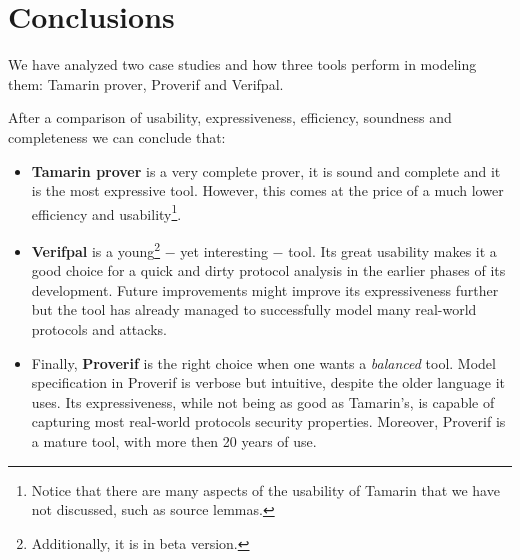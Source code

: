 
\section{Conclusions}
\label{section:conclusions}

We have analyzed two case studies and how three tools perform in modeling them: Tamarin prover, Proverif and Verifpal.

After a comparison of usability, expressiveness, efficiency, soundness and completeness we can conclude that:
\begin{itemize}
    \item{\textbf{Tamarin prover} is a very complete prover, it is sound and complete and it is the most expressive tool. However, this comes at the price of a much lower efficiency and usability\footnote{Notice that there are many aspects of the usability of Tamarin that we have not discussed, such as source lemmas.}.}
    \item{\textbf{Verifpal} is a young\footnote{Additionally, it is in beta version.} $-$ yet interesting $-$ tool. Its great usability makes it a good choice for a quick and dirty protocol analysis in the earlier phases of its development. Future improvements might improve its expressiveness further but the tool has already managed to successfully model many real-world protocols and attacks.}
    \item{Finally, \textbf{Proverif} is the right choice when one wants a \textit{balanced} tool. Model specification in Proverif is verbose but intuitive, despite the older language it uses. Its expressiveness, while not being as good as Tamarin's, is capable of capturing most real-world protocols security properties. Moreover, Proverif is a mature tool, with more then 20 years of use.}
\end{itemize}
